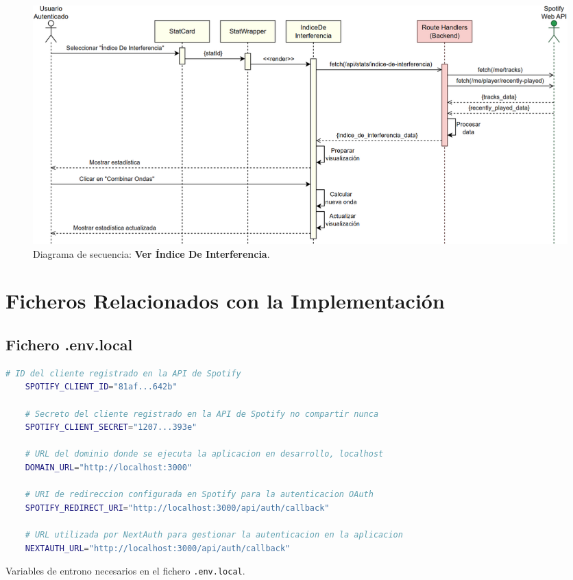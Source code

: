 \begin{figure}[H]
    \centering
    \includegraphics[width=\textwidth]{figures/diagramas_secuencia/ds_ver_indice_de_interferencia.png}
    \caption{Diagrama de secuencia: \textbf{Ver Índice De Interferencia}.}
    \label{fig:ds_ver_indice_de_interferencia}
\end{figure}

\chapter{Ficheros Relacionados con la Implementación} \label{ch:anexoC}

\section{Fichero .env.local}

\begin{ifalgorithm}[H]
    \begin{lstlisting}[language=bash]
    # ID del cliente registrado en la API de Spotify
    SPOTIFY_CLIENT_ID="81af...642b"

    # Secreto del cliente registrado en la API de Spotify no compartir nunca
    SPOTIFY_CLIENT_SECRET="1207...393e"

    # URL del dominio donde se ejecuta la aplicacion en desarrollo, localhost
    DOMAIN_URL="http://localhost:3000"

    # URI de redireccion configurada en Spotify para la autenticacion OAuth
    SPOTIFY_REDIRECT_URI="http://localhost:3000/api/auth/callback"

    # URL utilizada por NextAuth para gestionar la autenticacion en la aplicacion
    NEXTAUTH_URL="http://localhost:3000/api/auth/callback"
    \end{lstlisting}
    \caption{Variables de entrono necesarios en el fichero \texttt{.env.local}.}
    \label{alg:variables_entorno}
\end{ifalgorithm}


